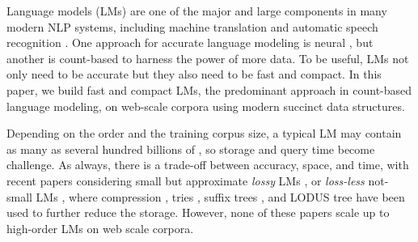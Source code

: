Language models (LMs) are one of the major and large components in many modern NLP systems, including machine translation \cite{koehn2010book} 
and automatic speech recognition \cite{rab93book}.
%
One approach for accurate language modeling is neural \cite{Bengio:2003:NPL:944919.944966,DBLP:conf/interspeech/MikolovKBCK10}, but another is  count-based to harness the power of more data.
%
%
To be useful, LMs not only need to be accurate but they also need to be fast and compact.
%
In this paper, we build  fast and compact \ngram LMs, the predominant approach in 
count-based language modeling, on web-scale corpora using modern succinct data structures.

%
%



Depending on the order and the training corpus size, a typical \ngram LM may contain as many as several hundred billions of \ngrams \cite{brants2007large},
so storage and query time become challenge.
%
As always, there is a trade-off between accuracy, space, and time, with recent papers considering small but approximate  \emph{lossy} LMs 
\cite{Chazelle:2004:BFE:982792.982797,guthrie2010storing},
or \emph{loss-less}  not-small LMs \cite{stolcke2011srilm}, where compression \cite{Germann:2009:TPT:1621947.1621952},  tries \cite{heafield2011kenlm}, 
suffix trees \cite{kennington2012suffix}, and LODUS tree \cite{sall11,DBLP:conf/acl/WatanabeTI09}  
have been used to further reduce the storage.
However, none of these papers scale up to high-order  
\ngram LMs on web scale corpora. 

